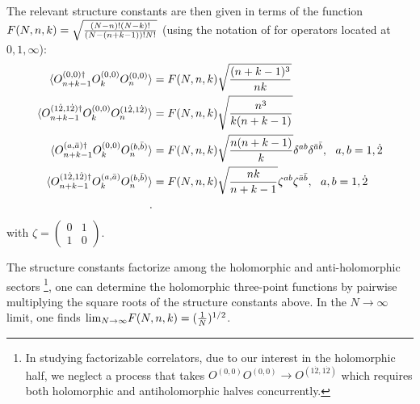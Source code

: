 \documentclass[11pt]{amsart}
\theoremstyle{thm}
\numberwithin{equation}{subsection}
\theoremstyle{def}
\theoremstyle{rem}
\begin{document}
The relevant structure constants are then given in terms of the function \\ $F(N, n, k) = \sqrt{ {(N-n)! (N-k)! \over (N-(n+k-1))! N!}}$ (using the notation of \cite{PakmanRastelli} for operators located at $0, 1, \infty$): 
\begin{align*}
\langle O^{(0,0) \dagger}_{n+k-1} O^{(0,0)}_k O^{(0,0)}_n \rangle &= F(N, n, k) \sqrt{{(n+k-1)^3 \over nk}}\\
\langle O^{(1\dot{2},1\dot{2}) \dagger}_{n+k-1} O^{(0,0)}_k O^{(1\dot{2},1\dot{2})}_n \rangle &= F(N, n, k) \sqrt{{n^3 \over k(n+k-1)}}\\
\langle O^{(a,\bar{a}) \dagger}_{n+k-1} O^{(0,0)}_k O^{(b,\bar{b})}_n \rangle &= F(N, n, k) \sqrt{{n(n+k-1) \over k}} \delta^{ab}\delta^{\bar{a} \bar{b}}, \ \  a, b = 1, \dot{2}\\
\langle O^{(1\dot{2}, 1\dot{2}) \dagger}_{n+k-1} O^{(a,\bar{a})}_k O^{(b,\bar{b})}_n \rangle &= F(N, n, k) \sqrt{{nk \over n+k-1}} \zeta^{ab}\zeta^{\bar{a} \bar{b}}, \ \  a, b = 1, \dot{2}\\.
\end{align*} with $\zeta = \begin{pmatrix} 0 & 1 \\ 1 & 0 \end{pmatrix}$. 

The structure constants factorize among the holomorphic and anti-holomorphic sectors \footnote{In studying factorizable correlators, due to our interest in the holomorphic half, we neglect a process that takes $O^{(0,0)}O^{(0,0)} \rightarrow O^{(1\dot{2}, 1\dot{2})}$ which requires both holomorphic and antiholomorphic halves concurrently.}, one can determine the holomorphic three-point functions by pairwise multiplying the square roots of the structure constants above. In the $N \rightarrow \infty$ limit, one finds $\text{lim}_{N \rightarrow \infty}F(N, n, k) = ({1 \over N})^{1/2}$. 
\end{document}
